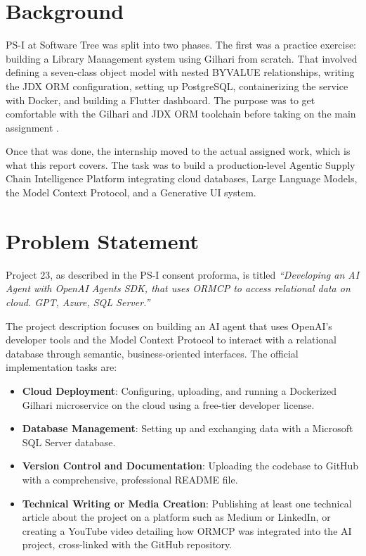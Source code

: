 \documentclass{book}
\begin{document}
\section{Background}

PS-I at Software Tree was split into two phases. The first was a practice exercise: building a Library Management system using Gilhari from scratch. That involved defining a seven-class object model with nested BYVALUE relationships, writing the JDX ORM configuration, setting up PostgreSQL, containerizing the service with Docker, and building a Flutter dashboard. The purpose was to get comfortable with the Gilhari and JDX ORM toolchain before taking on the main assignment \cite{gilhari}.

Once that was done, the internship moved to the actual assigned work, which is what this report covers. The task was to build a production-level Agentic Supply Chain Intelligence Platform integrating cloud databases, Large Language Models, the Model Context Protocol, and a Generative UI system.

\section{Problem Statement}

Project 23, as described in the PS-I consent proforma, is titled \textit{``Developing an AI Agent with OpenAI Agents SDK, that uses ORMCP to access relational data on cloud. GPT, Azure, SQL Server.''}

The project description focuses on building an AI agent that uses OpenAI's developer tools and the Model Context Protocol to interact with a relational database through semantic, business-oriented interfaces. The official implementation tasks are:

\begin{itemize}[itemsep=0pt]
\item \textbf{Cloud Deployment}: Configuring, uploading, and running a Dockerized Gilhari microservice on the cloud using a free-tier developer license.
\item \textbf{Database Management}: Setting up and exchanging data with a Microsoft SQL Server database.
\item \textbf{Version Control and Documentation}: Uploading the codebase to GitHub with a comprehensive, professional README file.
\item \textbf{Technical Writing or Media Creation}: Publishing at least one technical article about the project on a platform such as Medium or LinkedIn, or creating a YouTube video detailing how ORMCP was integrated into the AI project, cross-linked with the GitHub repository.
\end{itemize}
\end{document}
